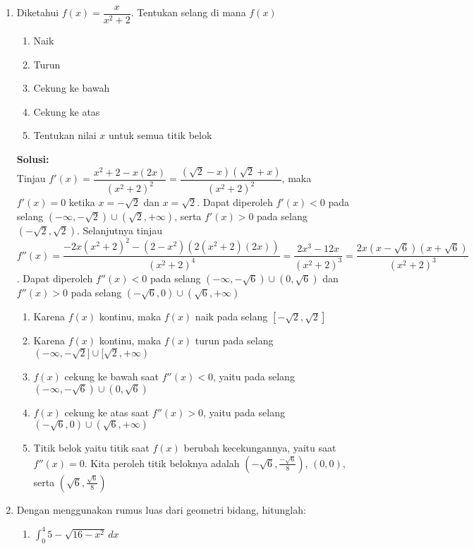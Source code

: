 \documentclass{article}
\begin{document}
\begin{enumerate}
\begin{enumerate}
\begin{center}
\begin{tikzpicture}
\end{tikzpicture}
		\end{center}
	 \end{enumerate}
	 \item Diketahui $f(x)=\dfrac{x}{x^2+2}$. Tentukan selang di mana $f(x)$
	 \begin{enumerate}
	 	\item Naik
	 	\item Turun
	 	\item Cekung ke bawah
	 	\item Cekung ke atas
	 	\item Tentukan nilai $x$ untuk semua titik belok
	 \end{enumerate}
	 \textbf{Solusi:}\\
	 Tinjau $f'(x)=\dfrac{x^2+2-x(2x)}{(x^2+2)^2}=\dfrac{(\sqrt{2}-x)(\sqrt{2}+x)}{(x^2+2)^2}$, maka $f'(x)=0$ ketika $x=-\sqrt{2}$ dan $x=\sqrt{2}$. Dapat diperoleh $f'(x)<0$ pada selang $(-\infty,-\sqrt{2})\cup (\sqrt{2},+\infty)$, serta $f'(x)>0$ pada selang $(-\sqrt{2},\sqrt{2})$. Selanjutnya tinjau $$ f''(x)=\dfrac{-2x(x^2+2)^2-(2-x^2)(2(x^2+2)(2x))}{(x^2+2)^4}=\dfrac{2x^3-12x}{(x^2+2)^3} = \dfrac{2x(x-\sqrt{6})(x+\sqrt{6})}{(x^2+2)^3} $$. Dapat diperoleh $f''(x)<0$ pada selang $(-\infty,-\sqrt{6})\cup (0,\sqrt{6})$ dan $f''(x)>0$ pada selang $(-\sqrt{6},0)\cup (\sqrt{6},+\infty)$
	 \begin{enumerate}
	 	\item Karena $f(x)$ kontinu, maka $f(x)$ naik pada selang $[-\sqrt{2},\sqrt{2}]$
	 	\item Karena $f(x)$ kontinu, maka $f(x)$ turun pada selang $(-\infty,-\sqrt{2}]\cup[\sqrt{2},+\infty)$
		\item $f(x)$ cekung ke bawah saat $f''(x)<0$, yaitu pada selang $(-\infty,-\sqrt{6})\cup (0,\sqrt{6})$	 	
	 	\item $f(x)$ cekung ke atas saat $f''(x)>0$, yaitu pada selang $(-\sqrt{6},0)\cup (\sqrt{6},+\infty)$
	 	\item Titik belok yaitu titik saat $f(x)$ berubah kecekungannya, yaitu saat $f''(x)=0$. Kita peroleh titik beloknya adalah $\left(-\sqrt{6},\frac{-\sqrt{6}}{8}\right)$, $(0,0)$, serta $\left(\sqrt{6},\frac{\sqrt{6}}{8}\right)$
	 \end{enumerate}
	 \item Dengan menggunakan rumus luas dari geometri bidang, hitunglah:
	 	\begin{enumerate}
	 		\item $\displaystyle \int_0^4 5-\sqrt{16-x^2} \, dx$

\end{enumerate}
\end{enumerate}
\end{document}
